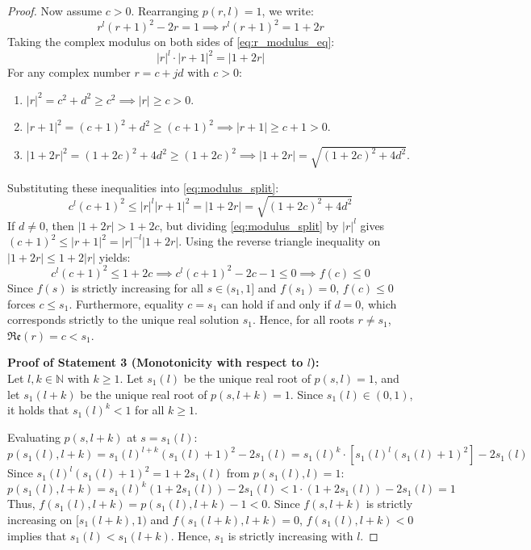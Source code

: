 \begin{proof}
Now assume $c > 0$. Rearranging $p(r, l) = 1$, we write:
\begin{equation}\label{eq:r_modulus_eq}
	r^{l}(r+1)^2 - 2r = 1 \implies r^{l}(r+1)^2 = 1 + 2r
\end{equation}
Taking the complex modulus on both sides of \eqref{eq:r_modulus_eq}:
\begin{equation}\label{eq:modulus_split}
	|r|^{l} \cdot |r+1|^2 = |1 + 2r|
\end{equation}
For any complex number $r = c + j d$ with $c > 0$:
\begin{enumerate}
    \item $|r|^2 = c^2 + d^2 \ge c^2 \implies |r| \ge c > 0$.
    \item $|r+1|^2 = (c+1)^2 + d^2 \ge (c+1)^2 \implies |r+1| \ge c+1 > 0$.
    \item $|1+2r|^2 = (1+2c)^2 + 4d^2 \ge (1+2c)^2 \implies |1+2r| = \sqrt{(1+2c)^2 + 4d^2}$.
\end{enumerate}
Substituting these inequalities into \eqref{eq:modulus_split}:
\begin{equation}
	c^{l}(c+1)^2 \le |r|^{l} |r+1|^2 = |1+2r| = \sqrt{(1+2c)^2 + 4d^2}
\end{equation}
If $d \neq 0$, then $|1+2r| > 1+2c$, but dividing \eqref{eq:modulus_split} by $|r|^{l}$ gives $(c+1)^2 \le |r+1|^2 = |r|^{-l} |1+2r|$. Using the reverse triangle inequality on $|1+2r| \le 1 + 2|r|$ yields:
\begin{equation}\label{eq:modulus_bound_c}
	c^{l}(c+1)^2 \le 1 + 2c \implies c^{l}(c+1)^2 - 2c - 1 \le 0 \implies f(c) \le 0
\end{equation}
Since $f(s)$ is strictly increasing for all $s \in (s_1, 1]$ and $f(s_1) = 0$, $f(c) \le 0$ forces $c \le s_1$. Furthermore, equality $c = s_1$ can hold if and only if $d = 0$, which corresponds strictly to the unique real solution $s_1$. Hence, for all roots $r \neq s_1$, $\mathfrak{Re}(r) = c < s_1$.

\vspace{0.5em}
\textbf{Proof of Statement 3 (Monotonicity with respect to $l$):}\\
Let $l, k \in \mathbb{N}$ with $k \ge 1$. Let $s_1(l)$ be the unique real root of $p(s, l) = 1$, and let $s_1(l+k)$ be the unique real root of $p(s, l+k) = 1$. Since $s_1(l) \in (0,1)$, it holds that $s_1(l)^k < 1$ for all $k \ge 1$.

Evaluating $p(s, l+k)$ at $s = s_1(l)$:
\begin{equation}
	p(s_1(l), l+k) = s_1(l)^{l+k}(s_1(l)+1)^2 - 2s_1(l) = s_1(l)^k \cdot \left[ s_1(l)^{l}(s_1(l)+1)^2 \right] - 2s_1(l)
\end{equation}
Since $s_1(l)^{l}(s_1(l)+1)^2 = 1 + 2s_1(l)$ from $p(s_1(l), l) = 1$:
\begin{equation}
	p(s_1(l), l+k) = s_1(l)^k (1 + 2s_1(l)) - 2s_1(l) < 1 \cdot (1 + 2s_1(l)) - 2s_1(l) = 1
\end{equation}
Thus, $f(s_1(l), l+k) = p(s_1(l), l+k) - 1 < 0$. Since $f(s, l+k)$ is strictly increasing on $[s_1(l+k), 1)$ and $f(s_1(l+k), l+k) = 0$, $f(s_1(l), l+k) < 0$ implies that $s_1(l) < s_1(l+k)$. Hence, $s_1$ is strictly increasing with $l$.
\end{proof}

